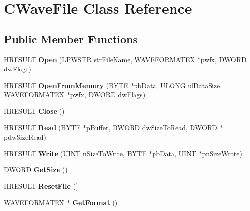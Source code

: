 \hypertarget{class_c_wave_file}{\section{C\+Wave\+File Class Reference}
\label{class_c_wave_file}
}
\subsection*{Public Member Functions}
\begin{DoxyCompactItemize}
\item 
\hypertarget{class_c_wave_file_a14ce677a0c459fd4f1798ff8c2d66005}{H\+R\+E\+S\+U\+L\+T {\bfseries Open} (L\+P\+W\+S\+T\+R str\+File\+Name, W\+A\+V\+E\+F\+O\+R\+M\+A\+T\+E\+X $\ast$pwfx, D\+W\+O\+R\+D dw\+Flags)}\label{class_c_wave_file_a14ce677a0c459fd4f1798ff8c2d66005}

\item 
\hypertarget{class_c_wave_file_abf4405c91380ebd3377f1368b45d7cbb}{H\+R\+E\+S\+U\+L\+T {\bfseries Open\+From\+Memory} (B\+Y\+T\+E $\ast$pb\+Data, U\+L\+O\+N\+G ul\+Data\+Size, W\+A\+V\+E\+F\+O\+R\+M\+A\+T\+E\+X $\ast$pwfx, D\+W\+O\+R\+D dw\+Flags)}\label{class_c_wave_file_abf4405c91380ebd3377f1368b45d7cbb}

\item 
\hypertarget{class_c_wave_file_a8ff8d99701abd0e8b15972619e6ac951}{H\+R\+E\+S\+U\+L\+T {\bfseries Close} ()}\label{class_c_wave_file_a8ff8d99701abd0e8b15972619e6ac951}

\item 
\hypertarget{class_c_wave_file_a1eb28886c3d56d2ff278de51803cfe64}{H\+R\+E\+S\+U\+L\+T {\bfseries Read} (B\+Y\+T\+E $\ast$p\+Buffer, D\+W\+O\+R\+D dw\+Size\+To\+Read, D\+W\+O\+R\+D $\ast$pdw\+Size\+Read)}\label{class_c_wave_file_a1eb28886c3d56d2ff278de51803cfe64}

\item 
\hypertarget{class_c_wave_file_a7c82ff281e7c3378b5a8f08c3561e537}{H\+R\+E\+S\+U\+L\+T {\bfseries Write} (U\+I\+N\+T n\+Size\+To\+Write, B\+Y\+T\+E $\ast$pb\+Data, U\+I\+N\+T $\ast$pn\+Size\+Wrote)}\label{class_c_wave_file_a7c82ff281e7c3378b5a8f08c3561e537}

\item 
\hypertarget{class_c_wave_file_a230c359dba9e652c0468b42345176984}{D\+W\+O\+R\+D {\bfseries Get\+Size} ()}\label{class_c_wave_file_a230c359dba9e652c0468b42345176984}

\item 
\hypertarget{class_c_wave_file_ae6791a066f89f5e147cc0f5d9f2dbdbc}{H\+R\+E\+S\+U\+L\+T {\bfseries Reset\+File} ()}\label{class_c_wave_file_ae6791a066f89f5e147cc0f5d9f2dbdbc}

\item 
\hypertarget{class_c_wave_file_adb0ec4bcfd6d91248dfe778275928559}{W\+A\+V\+E\+F\+O\+R\+M\+A\+T\+E\+X $\ast$ {\bfseries Get\+Format} ()}\label{class_c_wave_file_adb0ec4bcfd6d91248dfe778275928559}

\end{DoxyCompactItemize}

